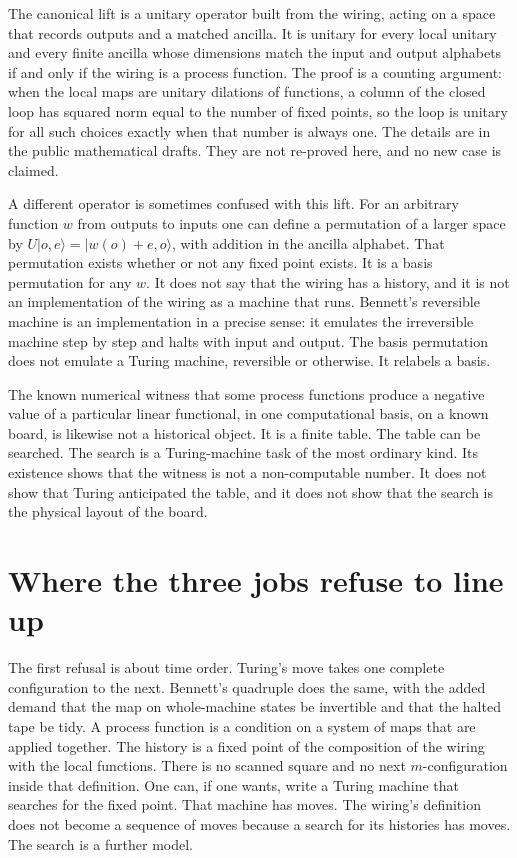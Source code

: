 \documentclass[12pt]{article}
\begin{document}
The canonical lift is a unitary operator built from the wiring, acting on a space that records outputs and a matched ancilla. It is unitary for every local unitary and every finite ancilla whose dimensions match the input and output alphabets if and only if the wiring is a process function. The proof is a counting argument: when the local maps are unitary dilations of functions, a column of the closed loop has squared norm equal to the number of fixed points, so the loop is unitary for all such choices exactly when that number is always one. The details are in the public mathematical drafts. They are not re-proved here, and no new case is claimed.

A different operator is sometimes confused with this lift. For an arbitrary function $w$ from outputs to inputs one can define a permutation of a larger space by $U\lvert o,e\rangle=\lvert w(o)+e,o\rangle$, with addition in the ancilla alphabet. That permutation exists whether or not any fixed point exists. It is a basis permutation for any $w$. It does not say that the wiring has a history, and it is not an implementation of the wiring as a machine that runs. Bennett's reversible machine is an implementation in a precise sense: it emulates the irreversible machine step by step and halts with input and output. The basis permutation does not emulate a Turing machine, reversible or otherwise. It relabels a basis.

The known numerical witness that some process functions produce a negative value of a particular linear functional, in one computational basis, on a known board, is likewise not a historical object. It is a finite table. The table can be searched. The search is a Turing-machine task of the most ordinary kind. Its existence shows that the witness is not a non-computable number. It does not show that Turing anticipated the table, and it does not show that the search is the physical layout of the board.

\section{Where the three jobs refuse to line up}
\label{sec:line}

The first refusal is about time order. Turing's move takes one complete configuration to the next. Bennett's quadruple does the same, with the added demand that the map on whole-machine states be invertible and that the halted tape be tidy. A process function is a condition on a system of maps that are applied together. The history is a fixed point of the composition of the wiring with the local functions. There is no scanned square and no next $m$-configuration inside that definition. One can, if one wants, write a Turing machine that searches for the fixed point. That machine has moves. The wiring's definition does not become a sequence of moves because a search for its histories has moves. The search is a further model.
\end{document}
